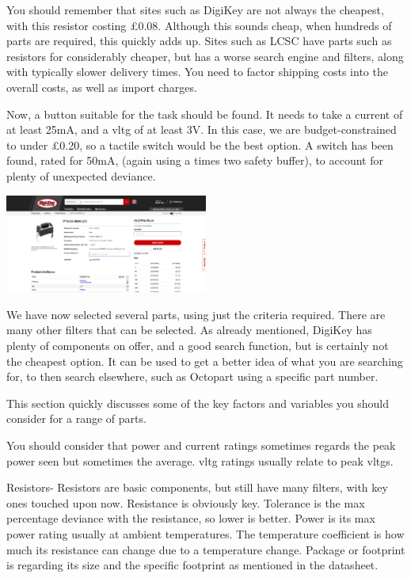 \documentclass[a4paper,11pt]{report}
\begin{document}
You should remember that sites such as DigiKey are not always the cheapest, with this resistor costing £0.08. Although this sounds cheap, when hundreds of parts are required, this quickly adds up. Sites such as LCSC have parts such as resistors for considerably cheaper, but has a worse search engine and filters, along with typically slower delivery times. You need to factor shipping costs into the overall costs, as well as import charges.

Now, a button suitable for the task should be found. It needs to take a current of at least 25mA, and a \gls{vltg} of at least 3V. In this case, we are budget-constrained to under £0.20, so a tactile switch would be the best option. A switch has been found, rated for 50mA, (again using a times two safety buffer), to account for plenty of unexpected deviance.

\includegraphics[width=0.5\textwidth]{screenshots/DigiKeyButton}

We have now selected several parts, using just the criteria required. There are many other filters that can be selected. As already mentioned, DigiKey has plenty of components on offer, and a good search function, but is certainly not the cheapest option. It can be used to get a better idea of what you are searching for, to then search elsewhere, such as Octopart using a specific part number.

This section quickly discusses some of the key factors and variables you should consider for a range of parts.

You should consider that power and current ratings sometimes regards the peak power seen but sometimes the average. \gls{vltg} ratings usually relate to peak \gls{vltg}s.

Resistors- Resistors are basic components, but still have many filters, with key ones touched upon now. Resistance is obviously key. Tolerance is the max percentage deviance with the resistance, so lower is better. Power is its max power rating usually at ambient temperatures. The temperature coefficient is how much its resistance can change due to a temperature change. Package or footprint is regarding its size and the specific footprint as mentioned in the datasheet.
\end{document}
